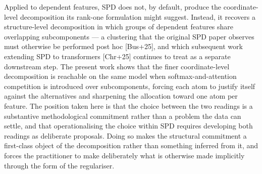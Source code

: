 Applied to dependent features, SPD does not, by default, produce the coordinate-level decomposition its rank-one formulation might suggest. Instead, it recovers a structure-level decomposition in which groups of dependent features share overlapping subcomponents — a clustering that the original SPD paper observes must otherwise be performed post hoc [Bus+25], and which subsequent work extending SPD to transformers [Chr+25] continues to treat as a separate downstream step. The present work shows that the finer coordinate-level decomposition is reachable on the same model when softmax-and-attention competition is introduced over subcomponents, forcing each atom to justify itself against the alternatives and sharpening the allocation toward one atom per feature. The position taken here is that the choice between the two readings is a substantive methodological commitment rather than a problem the data can settle, and that operationalising the choice within SPD requires developing both readings as deliberate proposals. Doing so makes the structural commitment a first-class object of the decomposition rather than something inferred from it, and forces the practitioner to make deliberately what is otherwise made implicitly through the form of the regulariser.